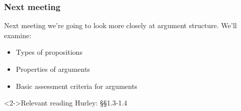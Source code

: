 \begin{frame}
\frametitle{Next meeting}

Next meeting we're going to look more closely at argument structure. We'll examine:
\begin{itemize}
  \item Types of propositions
  \item Properties of arguments
  \item Basic assessment criteria for arguments
\end{itemize}

\begin{block}<2->{Relevant reading}
  Hurley: \S\S 1.3-1.4
\end{block}

\end{frame}

